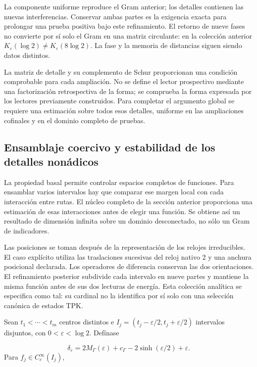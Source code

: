 La componente uniforme reproduce el Gram anterior; los detalles contienen las nuevas interferencias. Conservar ambas partes es la exigencia exacta para prolongar una prueba positiva bajo este refinamiento. El retorno de nueve fases no convierte por sí solo el Gram en una matriz circulante: en la colección anterior \(K_\varepsilon(\log2)\neq K_\varepsilon(8\log2)\). La fase y la memoria de distancias siguen siendo datos distintos.

La matriz de detalle y su complemento de Schur proporcionan una condición comprobable para cada ampliación. No se define el lector prospectivo mediante una factorización retrospectiva de la forma; se comprueba la forma expresada por los lectores previamente construidos. Para completar el argumento global se requiere una estimación sobre todos esos detalles, uniforme en las ampliaciones cofinales y en el dominio completo de pruebas.

\subsection{Ensamblaje coercivo y estabilidad de los detalles nonádicos}
\label{rz:ensamblaje}
La propiedad basal permite controlar espacios completos de funciones. Para ensamblar varios intervalos hay que comparar ese margen local con cada interacción entre rutas. El núcleo completo de la sección anterior proporciona una estimación de esas interacciones antes de elegir una función. Se obtiene así un resultado de dimensión infinita sobre un dominio desconectado, no sólo un Gram de indicadores.

Las posiciones se toman después de la representación de los relojes irreducibles. El caso explícito utiliza las traslaciones sucesivas del reloj nativo 2 y una anchura posicional declarada. Los operadores de diferencia conservan las dos orientaciones. El refinamiento posterior subdivide cada intervalo en nueve partes y mantiene la misma función antes de sus dos lecturas de energía. Esta colección analítica se especifica como tal: su cardinal no la identifica por sí solo con una selección canónica de estados TPK.

Sean \(t_1<\cdots<t_m\) centros distintos e \(I_j=(t_j-\varepsilon/2,t_j+\varepsilon/2)\) intervalos disjuntos, con \(0<\varepsilon<\log2\). Defínase

\[
\delta_\varepsilon=2M_\Gamma(\varepsilon)+c_\Gamma
-2\sinh(\varepsilon/2)+\varepsilon.
\]
Para \(f_j\in C_c^\infty(I_j)\),

